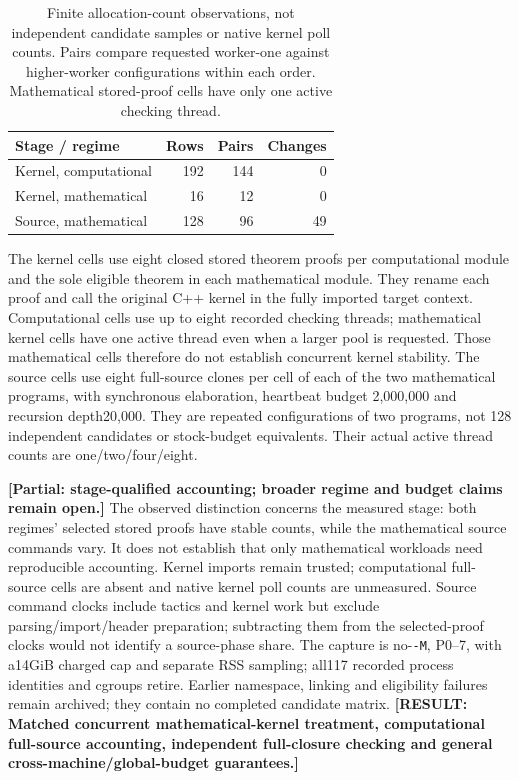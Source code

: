 \documentclass[10pt,twocolumn]{article}
\newcommand{\missing}[1]{\textbf{[RESULT: #1]}}
\newcommand{\partialev}[1]{\textbf{[Partial: #1]}}
\begin{document}
\begin{table}[t]
\centering\small
\begin{tabular}{lrrr}
\toprule
Stage / regime & Rows & Pairs & Changes\\
\midrule
Kernel, computational &192&144&0\\
Kernel, mathematical &16&12&0\\
Source, mathematical &128&96&49\\
\bottomrule
\end{tabular}
\caption{Finite allocation-count observations, not independent candidate
samples or native kernel poll counts. Pairs compare requested worker-one
against higher-worker configurations within each order.
Mathematical stored-proof cells have only one active checking thread.}
\label{tab:stagecounts}
\end{table}

The kernel cells use eight closed stored theorem proofs per computational
module and the sole eligible theorem in each mathematical module.
They rename each proof and call the original C++ kernel in the fully
imported target context. Computational cells use up to eight recorded
checking threads; mathematical kernel cells have one active thread even
when a larger pool is requested. Those mathematical cells therefore do
not establish concurrent kernel stability.
The source cells use eight full-source clones per cell of each of the two
mathematical programs, with synchronous elaboration, heartbeat budget
2,000,000 and recursion depth20,000. They are repeated configurations of
two programs, not 128 independent candidates or stock-budget equivalents.
Their actual active thread counts are one/two/four/eight.

\partialev{stage-qualified accounting; broader regime and budget claims remain open.}
The observed distinction concerns the measured stage: both regimes'
selected stored proofs have stable counts, while the mathematical source
commands vary. It does not establish that only mathematical workloads
need reproducible accounting. Kernel imports remain trusted; computational
full-source cells are absent and native kernel poll counts are unmeasured.
Source command clocks include tactics and kernel work but exclude
parsing/import/header preparation; subtracting them from the selected-proof
clocks would not identify a source-phase share.
The capture is no-\texttt{-M}, P0--7, with a14GiB charged cap and separate RSS
sampling; all117 recorded process identities and cgroups retire.
Earlier namespace, linking and eligibility failures remain archived;
they contain no completed candidate matrix.
\missing{Matched concurrent mathematical-kernel treatment, computational
full-source accounting, independent full-closure checking and general
cross-machine/global-budget guarantees.}
\end{document}
